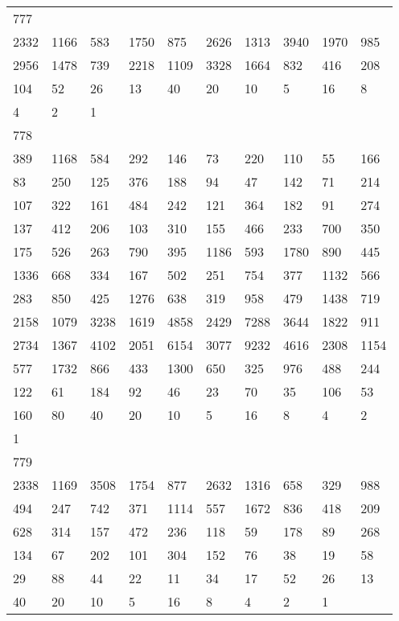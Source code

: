 \begin{longtable}{*{10}{l}}
777&&&&&&&&&\\
2332& 1166& 583& 1750& 875& 2626& 1313& 3940& 1970& 985\\
2956& 1478& 739& 2218& 1109& 3328& 1664& 832& 416& 208\\
104& 52& 26& 13& 40& 20& 10& 5& 16& 8\\
4& 2& 1& \\

778&&&&&&&&&\\
389& 1168& 584& 292& 146& 73& 220& 110& 55& 166\\
83& 250& 125& 376& 188& 94& 47& 142& 71& 214\\
107& 322& 161& 484& 242& 121& 364& 182& 91& 274\\
137& 412& 206& 103& 310& 155& 466& 233& 700& 350\\
175& 526& 263& 790& 395& 1186& 593& 1780& 890& 445\\
1336& 668& 334& 167& 502& 251& 754& 377& 1132& 566\\
283& 850& 425& 1276& 638& 319& 958& 479& 1438& 719\\
2158& 1079& 3238& 1619& 4858& 2429& 7288& 3644& 1822& 911\\
2734& 1367& 4102& 2051& 6154& 3077& 9232& 4616& 2308& 1154\\
577& 1732& 866& 433& 1300& 650& 325& 976& 488& 244\\
122& 61& 184& 92& 46& 23& 70& 35& 106& 53\\
160& 80& 40& 20& 10& 5& 16& 8& 4& 2\\
1& \\

779&&&&&&&&&\\
2338& 1169& 3508& 1754& 877& 2632& 1316& 658& 329& 988\\
494& 247& 742& 371& 1114& 557& 1672& 836& 418& 209\\
628& 314& 157& 472& 236& 118& 59& 178& 89& 268\\
134& 67& 202& 101& 304& 152& 76& 38& 19& 58\\
29& 88& 44& 22& 11& 34& 17& 52& 26& 13\\
40& 20& 10& 5& 16& 8& 4& 2& 1& \\


\end{longtable}
